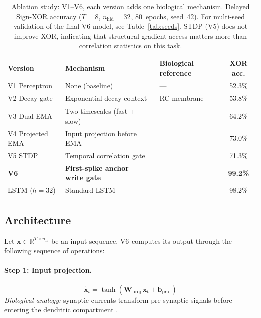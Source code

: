 \documentclass[11pt,a4paper]{article}
\begin{document}
\begin{table}[t]
\centering
\caption{%
Ablation study: V1--V6, each version adds one biological mechanism.
Delayed Sign-XOR accuracy ($T=8$, $n_\mathrm{hid}=32$, 80~epochs, seed~42).
For multi-seed validation of the final V6 model, see Table~\ref{tab:seeds}.
STDP (V5) does not improve XOR, indicating that structural gradient access
matters more than correlation statistics on this task.%
}
\label{tab:evolution}
\begin{tabular}{@{}lp{3.8cm}p{3.2cm}c@{}}
\toprule
Version & Mechanism & Biological reference & XOR acc. \\
\midrule
V1 Perceptron    & None (baseline)              & ---                            & 52.3\% \\
V2 Decay gate    & Exponential decay context    & RC membrane                    & 53.8\% \\
V3 Dual EMA      & Two timescales (fast + slow) & \citet{losonczy2006integrative}& 64.2\% \\
V4 Projected EMA & Input projection before EMA  & \citet{larkum2013cellular}     & 73.0\% \\
V5 STDP          & Temporal correlation gate    & \citet{bi1998synaptic}         & 71.3\% \\
\textbf{V6}      & \textbf{First-spike anchor + write gate} & \citet{thorpe2001spike} & \textbf{99.2\%} \\
\midrule
LSTM ($h=32$)    & Standard LSTM                & \citet{hochreiter1997long}     & 98.2\% \\
\bottomrule
\end{tabular}
\end{table}

\subsection{Architecture}
\label{sec:arch_desc}

Let $\mathbf{x} \in \mathbb{R}^{T\times n_\mathrm{in}}$ be an input sequence.
V6 computes its output through the following sequence of operations:

\paragraph{Step 1: Input projection.}
\begin{equation}
  \tilde{\mathbf{x}}_t = \tanh(\mathbf{W}_\mathrm{proj}\,\mathbf{x}_t
                                + \mathbf{b}_\mathrm{proj})
  \label{eq:proj}
\end{equation}
\emph{Biological analogy:} synaptic currents transform pre-synaptic signals
before entering the dendritic compartment \citep{larkum2013cellular}.
\end{document}

